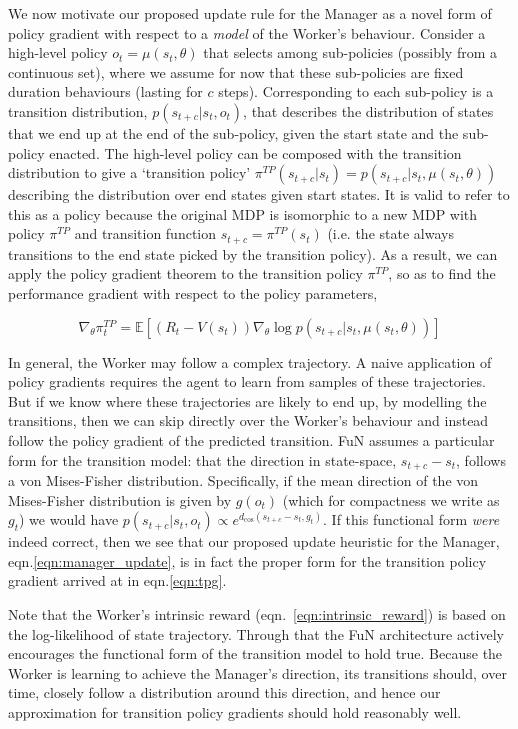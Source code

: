 We now motivate our proposed update rule for the Manager as a novel form of policy gradient with respect to a \emph{model} of the Worker's behaviour.
Consider a high-level policy $o_t = \mu(s_t, \theta)$ that selects among sub-policies (possibly from a continuous set), where we assume for now that these sub-policies are fixed duration behaviours (lasting for $c$ steps). 
Corresponding to each sub-policy is a transition distribution, $p(s_{t+c}|s_t,o_t)$, that describes the distribution of states that we end up at the end of the sub-policy, given the start state and the sub-policy enacted. The high-level policy can be composed with the transition distribution to give a `transition policy' $\pi^{TP}(s_{t+c}|s_t) = p(s_{t+c}|s_t,\mu(s_t, \theta))$ describing the distribution over end states given start states. It is valid to refer to this as a policy because the original MDP is isomorphic to a new MDP with policy $\pi^{TP}$ and transition function $s_{t+c} = \pi^{TP}(s_t)$ (i.e. the state always transitions to the end state picked by the transition policy). As a result, we can apply the policy gradient theorem to the transition policy $\pi^{TP}$, so as to find the performance gradient with respect to the policy parameters, \vspace{-5mm}


\begin{equation}
\nabla_{\theta} \pi^{TP}_t = \mathbb{E} \left[ (R_t - V(s_t)) \nabla_{\theta} \log p(s_{t+c}|s_t, \mu(s_t,\theta))\right]
\label{eqn:tpg}
\end{equation}


In general, the Worker may follow a complex trajectory. A naive application of policy gradients requires the agent to learn from samples of these trajectories. But if we know where these trajectories are likely to end up, by modelling the transitions, then we can skip directly over the Worker's behaviour and instead follow the policy gradient of the predicted transition. 
FuN assumes a particular form for the transition model: that the direction in state-space, $s_{t+c} - s_t$, follows a von Mises-Fisher distribution. Specifically, if the mean direction of the von Mises-Fisher distribution
is given by $g(o_t)$ (which for compactness we write as $g_t$) we would have
$p(s_{t+c}|s_t,o_t) \propto e^{d_{\cos}(s_{t+c} - s_t, g_t)}$. If this functional form
\emph{were} indeed correct, then we see that our proposed update heuristic for the
Manager, eqn.\ref{eqn:manager_update}, is in fact the proper form for the transition
policy gradient arrived at in eqn.\ref{eqn:tpg}.

Note that the Worker's intrinsic reward (eqn.~\ref{eqn:intrinsic_reward}) is based on the log-likelihood of state trajectory. Through that the FuN architecture actively encourages the functional form of the transition model to hold true. Because the Worker is learning to achieve the Manager's direction, its transitions should, over time, closely follow a distribution around this direction, and hence our approximation for transition policy gradients should hold reasonably well. 
